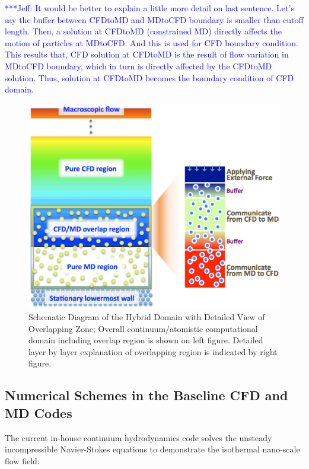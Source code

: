 \documentclass[preprint,12pt]{elsarticle}
\newcommand{\skonote}[1]{ {\textcolor{blue} { ***Jeff: #1 }}}
\newcommand{\skonote}[1]{}
\begin{document}
\skonote{It would be better to explain a little more detail on last sentence. Let's say the buffer between CFDtoMD and MDtoCFD boundary is smaller than cutoff length. Then, a solution at CFDtoMD (constrained MD) directly affects the motion of particles at MDtoCFD. And this is used for CFD boundary condition. This results that, CFD solution at CFDtoMD is the result of flow variation in MDtoCFD boundary, which in turn is directly affected by the CFDtoMD solution. Thus, solution at CFDtoMD becomes the boundary condition of CFD domain.}


\begin{figure}
\centering
\includegraphics[width=0.8\linewidth]{Couette7.pdf}
\vskip-0.2cm
\caption{\small Schematic Diagram of the Hybrid Domain with Detailed View of Overlapping Zone; Overall continuum/atomistic computational domain including overlap region is shown on left figure. Detailed layer by layer explanation of overlapping region is indicated by right figure.}
\label{Fig:Couette}
\vspace{-1em}
\end{figure}



\subsection{Numerical Schemes in the Baseline CFD and MD Codes}
The current in-house continuum hydrodynamics code solves the unsteady incompressible Navier-Stokes equations to demonstrate the isothermal nano-scale flow field:
\end{document}
